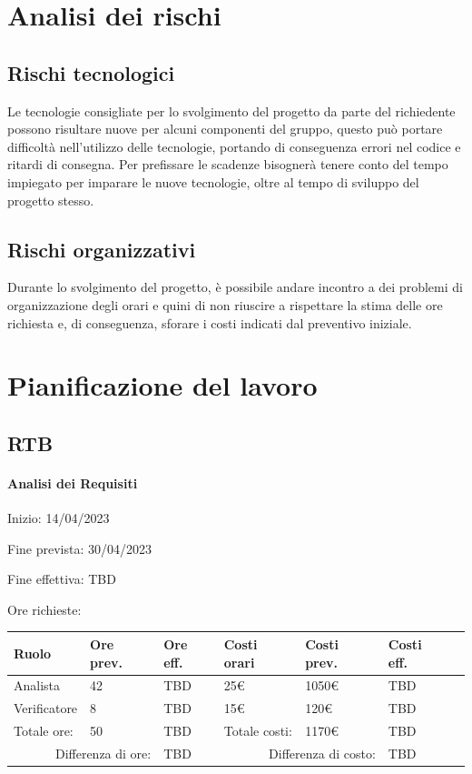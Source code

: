 \documentclass[a4paper, 12pt]{article}
\begin{document}
\makeindexdetails
\makefrontpage \makeversioni
\tableofcontents
\newpage
\clearpage
{} 

\section{Analisi dei rischi}

\subsection{Rischi tecnologici}
Le tecnologie consigliate per lo svolgimento del progetto da parte del richiedente possono risultare nuove per alcuni componenti del gruppo, questo può portare difficoltà nell'utilizzo delle tecnologie, portando di conseguenza errori nel codice e ritardi di consegna. \newline
Per prefissare le scadenze bisognerà tenere conto del tempo impiegato per imparare le nuove tecnologie, oltre al tempo di sviluppo del progetto stesso.

\subsection{Rischi organizzativi}
Durante lo svolgimento del progetto, è possibile andare incontro a dei problemi di organizzazione degli orari e quini di non riuscire a rispettare la stima delle ore richiesta e, di conseguenza, sforare i costi indicati dal preventivo iniziale.

\section{Pianificazione del lavoro}

\subsection{RTB}
\paragraph{Analisi dei Requisiti}
Inizio: 14/04/2023\par
Fine prevista: 30/04/2023\par
Fine effettiva: TBD

Ore richieste:\\[0.5em]
\begin{tabular}{|l|l|l||l|l|l|l|}\hline
Ruolo & Ore prev. & Ore eff. & Costi orari & Costi prev. & Costi eff.\\\hline
Analista & 42 & TBD & 25\euro & 1050\euro & TBD \\\hline
Verificatore & 8 & TBD & 15\euro & 120\euro & TBD \\\hline
Totale ore: & 50 & TBD & Totale costi: & 1170\euro & TBD \\\hline
\multicolumn{2}{|r|}{Differenza di ore:} & TBD & \multicolumn{2}{r|}{Differenza di costo:} & TBD \\\hline
\end{tabular}
\end{document}
